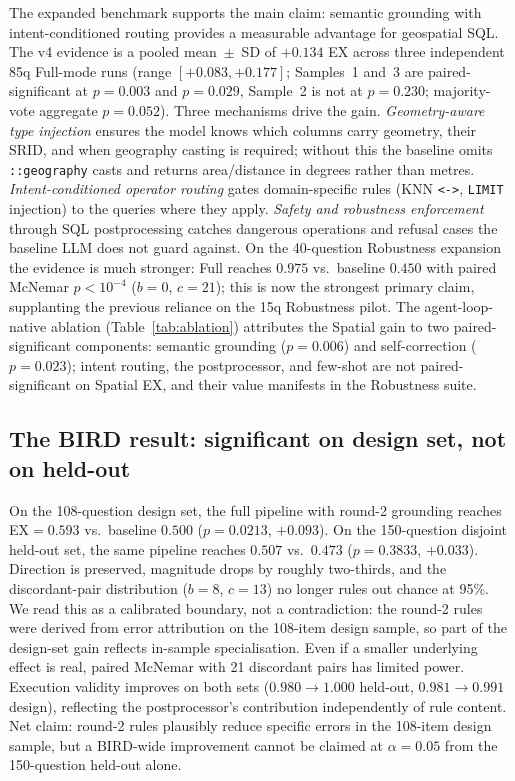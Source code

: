 \documentclass[11pt]{article}
\begin{document}
The expanded benchmark supports the main claim: semantic grounding with intent-conditioned routing provides a measurable advantage for geospatial SQL. The v4 evidence is a pooled mean~$\pm$~SD of $+0.134$ EX across three independent 85q Full-mode runs (range $[+0.083, +0.177]$; Samples~1 and~3 are paired-significant at $p=0.003$ and $p=0.029$, Sample~2 is not at $p=0.230$; majority-vote aggregate $p=0.052$). Three mechanisms drive the gain. \emph{Geometry-aware type injection} ensures the model knows which columns carry geometry, their SRID, and when geography casting is required; without this the baseline omits \texttt{::geography} casts and returns area/distance in degrees rather than metres. \emph{Intent-conditioned operator routing} gates domain-specific rules (KNN \texttt{<->}, \texttt{LIMIT} injection) to the queries where they apply. \emph{Safety and robustness enforcement} through SQL postprocessing catches dangerous operations and refusal cases the baseline LLM does not guard against. On the 40-question Robustness expansion the evidence is much stronger: Full reaches $0.975$ vs.\ baseline $0.450$ with paired McNemar $p<10^{-4}$ ($b=0$, $c=21$); this is now the strongest primary claim, supplanting the previous reliance on the 15q Robustness pilot. The agent-loop-native ablation (Table~\ref{tab:ablation}) attributes the Spatial gain to two paired-significant components: semantic grounding ($p=0.006$) and self-correction ($p=0.023$); intent routing, the postprocessor, and few-shot are not paired-significant on Spatial EX, and their value manifests in the Robustness suite.

\subsection{The BIRD result: significant on design set, not on held-out}

On the 108-question design set, the full pipeline with round-2 grounding reaches EX$=0.593$ vs.\ baseline $0.500$ ($p=0.0213$, $+0.093$). On the 150-question disjoint held-out set, the same pipeline reaches $0.507$ vs.\ $0.473$ ($p=0.3833$, $+0.033$). Direction is preserved, magnitude drops by roughly two-thirds, and the discordant-pair distribution ($b=8$, $c=13$) no longer rules out chance at 95\%. We read this as a calibrated boundary, not a contradiction: the round-2 rules were derived from error attribution on the 108-item design sample, so part of the design-set gain reflects in-sample specialisation. Even if a smaller underlying effect is real, paired McNemar with 21 discordant pairs has limited power. Execution validity improves on both sets ($0.980\to 1.000$ held-out, $0.981\to 0.991$ design), reflecting the postprocessor's contribution independently of rule content. Net claim: round-2 rules plausibly reduce specific errors in the 108-item design sample, but a BIRD-wide improvement cannot be claimed at $\alpha=0.05$ from the 150-question held-out alone.
\end{document}
